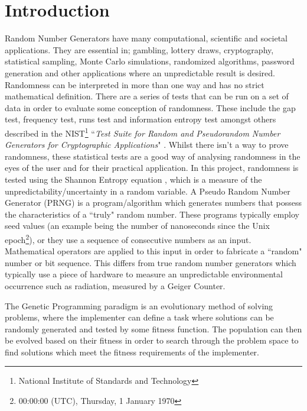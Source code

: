 \documentclass[a4paper,10.5pt]{article}
\begin{document}
\section{Introduction}
Random Number Generators have many computational, scientific and societal applications. They are essential in; gambling, lottery draws, cryptography, statistical sampling, Monte Carlo simulations, randomized algorithms, password generation and other applications where an unpredictable result is desired. Randomness can be interpreted in more than one way and has no strict mathematical definition. There are a series of tests that can be run on a set of data in order to evaluate some conception of randomness. These include the gap test, frequency test, runs test and information entropy test amongst others described in the NIST\footnote{National Institute of Standards and Technology} ``\emph{Test Suite for Random and Pseudorandom Number Generators for Cryptographic Applications}" \cite{nist}. Whilst there isn't a way to prove randomness, these statistical tests are a good way of analysing randomness in the eyes of the user and for their practical application. In this project, randomness is tested using the Shannon Entropy equation \cite[p.2]{kozarng}, which is a measure of the unpredictability/uncertainty in a random variable.
A Pseudo Random Number Generator (PRNG) is a program/algorithm which generates numbers that possess the characteristics of a ``truly" random number. These programs typically employ seed values (an example being the number of nanoseconds since the Unix epoch\footnote{00:00:00 (UTC), Thursday, 1 January 1970}), or they use a sequence of consecutive numbers as an input. Mathematical operators are applied to this input in order to fabricate a ``random" number or bit sequence. This differs from true random number generators which typically use a piece of hardware to measure an unpredictable environmental occurrence such as radiation, measured by a Geiger Counter. 

The Genetic Programming paradigm is an evolutionary method of solving problems, where the implementer can define a task where solutions can be randomly generated and tested by some fitness function. The population can then be evolved based on their fitness in order to search through the problem space to find solutions which meet the fitness requirements of the implementer. 
\end{document}
